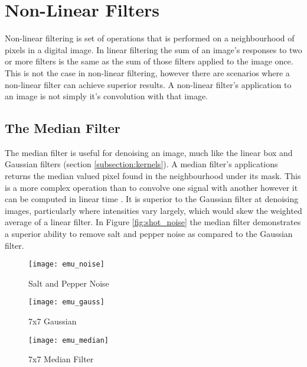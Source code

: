 \section{Non-Linear Filters}

Non-linear filtering is set of operations that is performed on a neighbourhood of pixels in a digital image. In linear filtering the sum of an image's responses to two or more filters is the same as the sum of those filters applied to the image once. This is not the case in non-linear filtering, however there are scenarios where a non-linear filter can achieve superior results. A non-linear filter's application to an image is not simply it's convolution with that image.

\subsection{The Median Filter}
\label{subsection:median_filter}
The median filter is useful for denoising an image, much like the linear box and Gaussian filters (section \ref{subsection:kernels}). A median filter's applications returns the median valued pixel found in the neighbourhood under its mask. This is a more complex operation than to convolve one signal with another however it can be computed in linear time \cite{cormen_2001}. It is superior to the Gaussian filter at denoising images, particularly where intensities vary largely, which would skew the weighted average of a linear filter. In Figure \ref{fig:shot_noise} the median filter demonstrates a superior ability to remove salt and pepper noise as compared to the Gaussian filter.

\begin{figure*}[htbp]
    \centering 
    \begin{subfigure}[b]{0.3\textwidth}
        \texttt{[image: emu\_noise]}
        \caption{Salt and Pepper Noise}
        \label{fig:emu_noise}
    \end{subfigure}
    \begin{subfigure}[b]{0.3\textwidth}
        \texttt{[image: emu\_gauss]}
        \caption{7x7 Gaussian}
        \label{fig:emu_gauss}
    \end{subfigure}
    \begin{subfigure}[b]{0.3\textwidth}
        \texttt{[image: emu\_median]}
        \caption{7x7 Median Filter}
        \label{fig:emu_median}
    \end{subfigure}
    \captionsetup{format=hang}
    \caption{Filtering out salt and pepper noise with Gaussian and median filter. Original image by Grant Durr.}
    \label{fig:shot_noise}
\end{figure*}